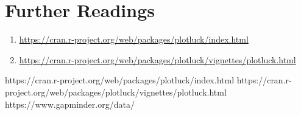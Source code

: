 \section{Further Readings}
\begin{enumerate}
    \item \url{https://cran.r-project.org/web/packages/plotluck/index.html}
    \item \url{https://cran.r-project.org/web/packages/plotluck/vignettes/plotluck.html}
\end{enumerate}

\begin{thebibliography}{99}

    https://cran.r-project.org/web/packages/plotluck/index.html
    https://cran.r-project.org/web/packages/plotluck/vignettes/plotluck.html
    https://www.gapminder.org/data/


\end{thebibliography}
